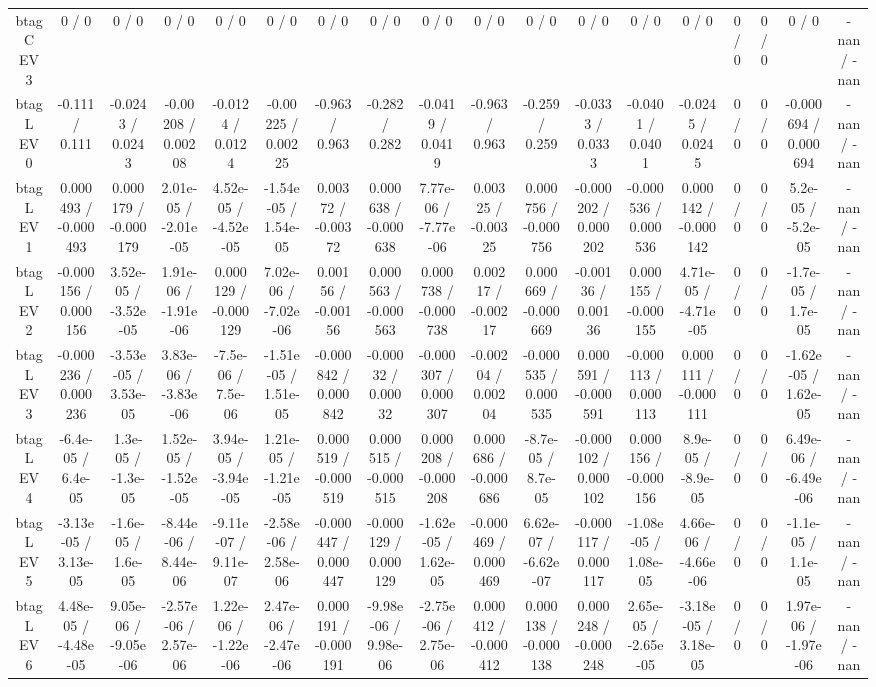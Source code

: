 \documentclass[10pt]{article}
\begin{document}
\begin{table}[htbp]
\begin{center}
\begin{tabular}{|c|c|c|c|c|c|c|c|c|c|c|c|c|c|c|c|c|c|}
  btag C EV 3 & 0 / 0 & 0 / 0 & 0 / 0 & 0 / 0 & 0 / 0 & 0 / 0 & 0 / 0 & 0 / 0 & 0 / 0 & 0 / 0 & 0 / 0 & 0 / 0 & 0 / 0 & 0 / 0 & 0 / 0 & 0 / 0 & -nan / -nan \\ 
  btag L EV 0 & -0.111 / 0.111 & -0.0243 / 0.0243 & -0.00208 / 0.00208 & -0.0124 / 0.0124 & -0.00225 / 0.00225 & -0.963 / 0.963 & -0.282 / 0.282 & -0.0419 / 0.0419 & -0.963 / 0.963 & -0.259 / 0.259 & -0.0333 / 0.0333 & -0.0401 / 0.0401 & -0.0245 / 0.0245 & 0 / 0 & 0 / 0 & -0.000694 / 0.000694 & -nan / -nan \\ 
  btag L EV 1 & 0.000493 / -0.000493 & 0.000179 / -0.000179 & 2.01e-05 / -2.01e-05 & 4.52e-05 / -4.52e-05 & -1.54e-05 / 1.54e-05 & 0.00372 / -0.00372 & 0.000638 / -0.000638 & 7.77e-06 / -7.77e-06 & 0.00325 / -0.00325 & 0.000756 / -0.000756 & -0.000202 / 0.000202 & -0.000536 / 0.000536 & 0.000142 / -0.000142 & 0 / 0 & 0 / 0 & 5.2e-05 / -5.2e-05 & -nan / -nan \\ 
  btag L EV 2 & -0.000156 / 0.000156 & 3.52e-05 / -3.52e-05 & 1.91e-06 / -1.91e-06 & 0.000129 / -0.000129 & 7.02e-06 / -7.02e-06 & 0.00156 / -0.00156 & 0.000563 / -0.000563 & 0.000738 / -0.000738 & 0.00217 / -0.00217 & 0.000669 / -0.000669 & -0.00136 / 0.00136 & 0.000155 / -0.000155 & 4.71e-05 / -4.71e-05 & 0 / 0 & 0 / 0 & -1.7e-05 / 1.7e-05 & -nan / -nan \\ 
  btag L EV 3 & -0.000236 / 0.000236 & -3.53e-05 / 3.53e-05 & 3.83e-06 / -3.83e-06 & -7.5e-06 / 7.5e-06 & -1.51e-05 / 1.51e-05 & -0.000842 / 0.000842 & -0.00032 / 0.00032 & -0.000307 / 0.000307 & -0.00204 / 0.00204 & -0.000535 / 0.000535 & 0.000591 / -0.000591 & -0.000113 / 0.000113 & 0.000111 / -0.000111 & 0 / 0 & 0 / 0 & -1.62e-05 / 1.62e-05 & -nan / -nan \\ 
  btag L EV 4 & -6.4e-05 / 6.4e-05 & 1.3e-05 / -1.3e-05 & 1.52e-05 / -1.52e-05 & 3.94e-05 / -3.94e-05 & 1.21e-05 / -1.21e-05 & 0.000519 / -0.000519 & 0.000515 / -0.000515 & 0.000208 / -0.000208 & 0.000686 / -0.000686 & -8.7e-05 / 8.7e-05 & -0.000102 / 0.000102 & 0.000156 / -0.000156 & 8.9e-05 / -8.9e-05 & 0 / 0 & 0 / 0 & 6.49e-06 / -6.49e-06 & -nan / -nan \\ 
  btag L EV 5 & -3.13e-05 / 3.13e-05 & -1.6e-05 / 1.6e-05 & -8.44e-06 / 8.44e-06 & -9.11e-07 / 9.11e-07 & -2.58e-06 / 2.58e-06 & -0.000447 / 0.000447 & -0.000129 / 0.000129 & -1.62e-05 / 1.62e-05 & -0.000469 / 0.000469 & 6.62e-07 / -6.62e-07 & -0.000117 / 0.000117 & -1.08e-05 / 1.08e-05 & 4.66e-06 / -4.66e-06 & 0 / 0 & 0 / 0 & -1.1e-05 / 1.1e-05 & -nan / -nan \\ 
  btag L EV 6 & 4.48e-05 / -4.48e-05 & 9.05e-06 / -9.05e-06 & -2.57e-06 / 2.57e-06 & 1.22e-06 / -1.22e-06 & 2.47e-06 / -2.47e-06 & 0.000191 / -0.000191 & -9.98e-06 / 9.98e-06 & -2.75e-06 / 2.75e-06 & 0.000412 / -0.000412 & 0.000138 / -0.000138 & 0.000248 / -0.000248 & 2.65e-05 / -2.65e-05 & -3.18e-05 / 3.18e-05 & 0 / 0 & 0 / 0 & 1.97e-06 / -1.97e-06 & -nan / -nan \\ 

\end{tabular}
\end{center}
\end{table}
\end{document}
